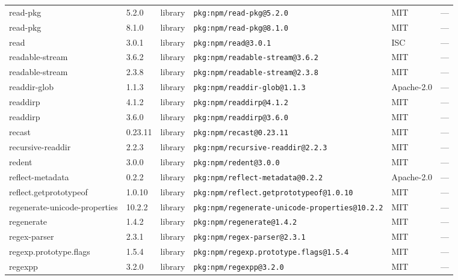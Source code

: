 \documentclass[11pt,a4paper]{article}
\begin{document}
\begin{longtable}{|p{4cm}|p{2cm}|p{1.6cm}|p{5cm}|p{1.5cm}|p{3.5cm}|}
\raggedright read-pkg & 5.2.0 & library & \small\texttt{pkg:npm/read-pkg@5.2.0} & MIT & \small — \\
\raggedright read-pkg & 8.1.0 & library & \small\texttt{pkg:npm/read-pkg@8.1.0} & MIT & \small — \\
\raggedright read & 3.0.1 & library & \small\texttt{pkg:npm/read@3.0.1} & ISC & \small — \\
\raggedright readable-stream & 3.6.2 & library & \small\texttt{pkg:npm/readable-stream@3.6.2} & MIT & \small — \\
\raggedright readable-stream & 2.3.8 & library & \small\texttt{pkg:npm/readable-stream@2.3.8} & MIT & \small — \\
\raggedright readdir-glob & 1.1.3 & library & \small\texttt{pkg:npm/readdir-glob@1.1.3} & Apache-2.0 & \small — \\
\raggedright readdirp & 4.1.2 & library & \small\texttt{pkg:npm/readdirp@4.1.2} & MIT & \small — \\
\raggedright readdirp & 3.6.0 & library & \small\texttt{pkg:npm/readdirp@3.6.0} & MIT & \small — \\
\raggedright recast & 0.23.11 & library & \small\texttt{pkg:npm/recast@0.23.11} & MIT & \small — \\
\raggedright recursive-readdir & 2.2.3 & library & \small\texttt{pkg:npm/recursive-readdir@2.2.3} & MIT & \small — \\
\raggedright redent & 3.0.0 & library & \small\texttt{pkg:npm/redent@3.0.0} & MIT & \small — \\
\raggedright reflect-metadata & 0.2.2 & library & \small\texttt{pkg:npm/reflect-metadata@0.2.2} & Apache-2.0 & \small — \\
\raggedright reflect.getprototypeof & 1.0.10 & library & \small\texttt{pkg:npm/reflect.getprototypeof@1.0.10} & MIT & \small — \\
\raggedright regenerate-unicode-properties & 10.2.2 & library & \small\texttt{pkg:npm/regenerate-unicode-properties@10.2.2} & MIT & \small — \\
\raggedright regenerate & 1.4.2 & library & \small\texttt{pkg:npm/regenerate@1.4.2} & MIT & \small — \\
\raggedright regex-parser & 2.3.1 & library & \small\texttt{pkg:npm/regex-parser@2.3.1} & MIT & \small — \\
\raggedright regexp.prototype.flags & 1.5.4 & library & \small\texttt{pkg:npm/regexp.prototype.flags@1.5.4} & MIT & \small — \\
\raggedright regexpp & 3.2.0 & library & \small\texttt{pkg:npm/regexpp@3.2.0} & MIT & \small — \\

\end{longtable}
\end{document}
